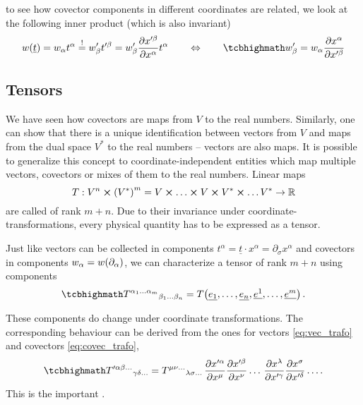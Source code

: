 to see how covector components in different coordinates are related, we look at the following inner product (which is also invariant)
\begin{equation}\label{eq:covec_trafo}
w\qty(\underline{t}) = w_\alpha t^\alpha \overset{!}{=} w'_\beta t'^\beta = w'_\beta \pdv{x'^\beta}{x^\alpha} t^\alpha
\qquad \Leftrightarrow \qquad
\eqbox{
w'_\beta = w_\alpha \pdv{x^\alpha}{x'^\beta}
}
\end{equation}



		\subsection{Tensors}
We have seen how covectors are maps from $V$ to the real numbers. Similarly, one can show that there is a unique identification between vectors from $V$ and maps from the dual space $V^*$ to the real numbers -- vectors are also maps. It is possible to generalize this concept to coordinate-independent entities which map multiple vectors, covectors or mixes of them to the real numbers. Linear maps
\begin{equation}
T: V^n \cross \qty(V^*)^m = V \cross \dots \cross V \cross V^* \cross \dots V^* \rightarrow \mathbb{R}
\end{equation}
are called  of rank $m + n$. Due to their invariance under coordinate-transformations, every physical quantity has to be expressed as a tensor.

Just like vectors can be collected in components $t^\alpha = \underline{t} \cdot x^\alpha = \partial_\sigma x^\alpha$ and covectors in components $w_\alpha = w\qty(\partial_\alpha)$, we can characterize a tensor of rank $m + n$ using components
\begin{equation}
\eqbox{
T^{\alpha_1 \dots \alpha_m}{}_{\beta_1 \dots \beta_n} = T\qty(\underline{e_1}, \dots, \underline{e_n}, \underline{e^1}, \dots, \underline{e^m})
} \, .
\end{equation}

These components do change under coordinate transformations. The corresponding behaviour can be derived from the ones for vectors \eqref{eq:vec_trafo} and covectors \eqref{eq:covec_trafo},
\begin{equation}
\eqbox{
T'^{\alpha \beta \dots}{}_{\gamma \delta \dots} = T^{\mu \nu \dots}{}_{\lambda \sigma \dots} \, \pdv{x'^\alpha}{x^\mu} \pdv{x'^\beta}{x^\nu} \dots \, \pdv{x^\lambda}{x'^\gamma} \pdv{x^\sigma}{x'^\delta} \dots
} \, .
\end{equation}
This is the important .\\


